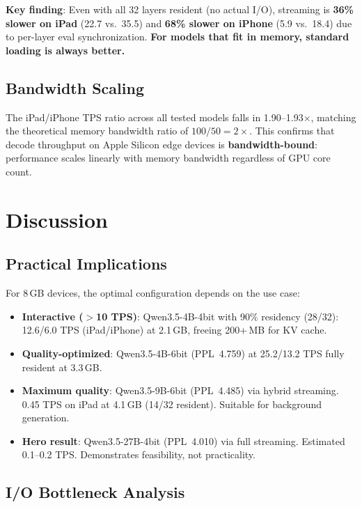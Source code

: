\documentclass[10pt,a4paper]{article}
\begin{document}
\textbf{Key finding}: Even with all 32 layers resident (no actual I/O), streaming is \textbf{36\% slower on iPad} (22.7 vs.\ 35.5) and \textbf{68\% slower on iPhone} (5.9 vs.\ 18.4) due to per-layer eval synchronization. \textbf{For models that fit in memory, standard loading is always better.}

\subsection{Bandwidth Scaling}

The iPad/iPhone TPS ratio across all tested models falls in 1.90--1.93$\times$, matching the theoretical memory bandwidth ratio of $100/50 = 2\times$. This confirms that decode throughput on Apple Silicon edge devices is \textbf{bandwidth-bound}: performance scales linearly with memory bandwidth regardless of GPU core count.

\section{Discussion}

\subsection{Practical Implications}

For 8\,GB devices, the optimal configuration depends on the use case:
\begin{itemize}
    \item \textbf{Interactive ($>$10 TPS)}: Qwen3.5-4B-4bit with 90\% residency (28/32): 12.6/6.0 TPS (iPad/iPhone) at 2.1\,GB, freeing 200+\,MB for KV cache.
    \item \textbf{Quality-optimized}: Qwen3.5-4B-6bit (PPL~4.759) at 25.2/13.2 TPS fully resident at 3.3\,GB.
    \item \textbf{Maximum quality}: Qwen3.5-9B-6bit (PPL~4.485) via hybrid streaming. 0.45 TPS on iPad at 4.1\,GB (14/32 resident). Suitable for background generation.
    \item \textbf{Hero result}: Qwen3.5-27B-4bit (PPL~4.010) via full streaming. Estimated 0.1--0.2 TPS. Demonstrates feasibility, not practicality.
\end{itemize}

\subsection{I/O Bottleneck Analysis}
\end{document}
